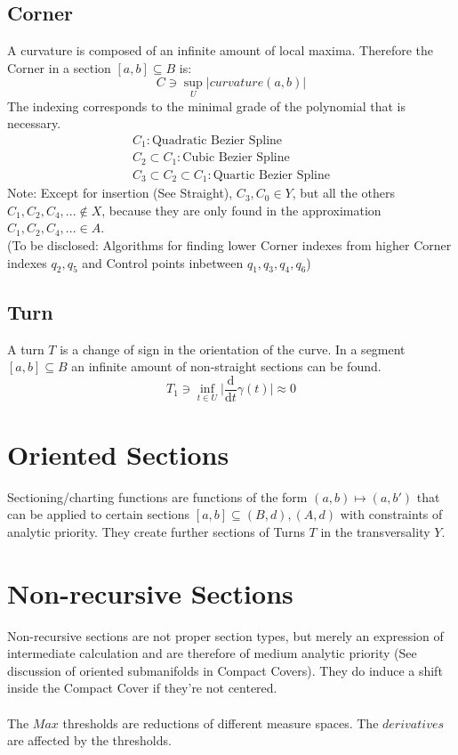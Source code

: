 \documentclass{report}
\begin{document}
\subsection{Corner}
A curvature is composed of an infinite amount of local maxima. Therefore the Corner in a section $[a,b] \subseteq B$ is:
\begin{equation}
C \ni \sup_{U}\lvert curvature(a,b) \rvert
\end{equation}
The indexing corresponds to the minimal grade of the polynomial that is necessary.
\begin{align}
C_{1} : \text{Quadratic Bezier Spline}\\
C_{2} \subset C_{1} : \text{Cubic Bezier Spline}\\
C_{3} \subset C_{2} \subset C_{1} : \text{Quartic Bezier Spline}
\end{align}
Note: Except for insertion (See Straight), $C_{3},C_{0} \in Y$, but all the others $C_{1},C_{2},C_{4},... \not\in X$, because they are only found in the approximation $C_{1},C_{2},C_{4},... \in A$.\\
(To be disclosed: Algorithms for finding lower Corner indexes from higher Corner indexes $q_{2},q_{5}$ and Control points inbetween $q_{1},q_{3},q_{4},q_{6}$)

\subsection{Turn}
A turn $T$ is a change of sign in the orientation of the curve. In a segment $[a,b] \subseteq B$ an infinite amount of non-straight sections can be found.
\begin{equation}
T_{1} \ni \inf_{t \in U} \lvert \frac{\mathrm{d}}{\mathrm{d}t}\gamma(t) \rvert \approx 0
\end{equation}

\section*{Oriented Sections}
Sectioning/charting functions are functions of the form $(a,b) \mapsto (a,b')$ that can be applied to certain sections $[a,b] \subseteq (B,d),(A,d)$ with constraints of analytic priority. They create further sections of Turns $T$ in the transversality $Y$.

\section{Non-recursive Sections}
Non-recursive sections are not proper section types, but merely an expression of intermediate calculation and are therefore of medium analytic priority (See discussion of oriented submanifolds in Compact Covers). They do induce a shift inside the Compact Cover if they're not centered.\\\\
The $Max$ thresholds are reductions of different measure spaces. The $derivatives$ are affected by the thresholds.
\end{document}
